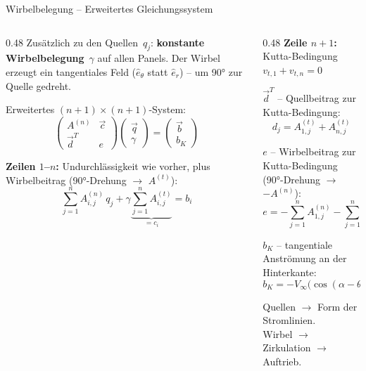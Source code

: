 \documentclass[aspectratio=169]{beamer}
\begin{document}
\begin{frame}{Wirbelbelegung -- Erweitertes Gleichungssystem}
\footnotesize

\begin{columns}[T]
\begin{column}{0.48\textwidth}
Zusätzlich zu den Quellen~$q_j$: \textbf{konstante
Wirbelbelegung}~$\gamma$ auf allen Panels.
Der Wirbel erzeugt ein tangentiales Feld
($\hat{e}_\theta$ statt $\hat{e}_r$) -- um 90° zur Quelle gedreht.

\smallskip
Erweitertes $(n\!+\!1)\times(n\!+\!1)$-System:
\vspace{-1mm}
\[
  \begin{pmatrix} A^{(n)} & \vec{c} \\ \vec{d}^T & e \end{pmatrix}
  \begin{pmatrix} \vec{q} \\ \gamma \end{pmatrix}
  = \begin{pmatrix} \vec{b} \\ b_K \end{pmatrix}
\]

\vspace{-2mm}
\textbf{Zeilen $1$--$n$:} Undurchlässigkeit wie vorher,
plus Wirbelbeitrag (90°-Drehung $\to$ $A^{(t)}$):
\vspace{-1mm}
\[
  \sum_{j=1}^{n} A^{(n)}_{i,j}\,q_j
  + \gamma\underbrace{\sum_{j=1}^{n} A^{(t)}_{i,j}}_{= c_i}
  = b_i
\]
\end{column}
\begin{column}{0.48\textwidth}
\textbf{Zeile $n\!+\!1$:} Kutta-Bedingung $v_{t,1}+v_{t,n}=0$

\smallskip
$\vec{d}^T$ -- Quellbeitrag zur Kutta-Bedingung:
\vspace{-1mm}
\[
  d_j = A^{(t)}_{1,j} + A^{(t)}_{n,j}
\]

\vspace{-3mm}
$e$ -- Wirbelbeitrag zur Kutta-Bedingung
(90°-Drehung $\to$ $-A^{(n)}$):
\vspace{-1mm}
\[
  e = -\sum_{j=1}^{n} A^{(n)}_{1,j} - \sum_{j=1}^{n} A^{(n)}_{n,j}
\]

\vspace{-3mm}
$b_K$ -- tangentiale Anströmung an der Hinterkante:
\vspace{-1mm}
\[
  b_K = -V_\infty\bigl(\cos(\alpha\!-\!\theta_1)+\cos(\alpha\!-\!\theta_n)\bigr)
\]

\vspace{-3mm}
Quellen $\to$ Form der Stromlinien.\\
Wirbel $\to$ Zirkulation $\to$ Auftrieb.
\end{column}
\end{columns}

\end{frame}
\end{document}
